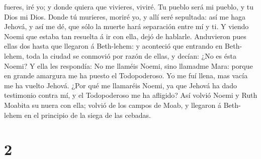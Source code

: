 fueres, iré yo; y donde quiera que vivieres, viviré. Tu pueblo será mi
pueblo, y tu Dios mi Dios.  Donde tú murieres, moriré yo,
y allí seré sepultada: así me haga Jehová, y así me dé, que sólo la
muerte hará separación entre mí y ti.  Y viendo Noemi que
estaba tan resuelta á ir con ella, dejó de hablarle. 
Anduvieron pues ellas dos hasta que llegaron á Beth-lehem: y aconteció
que entrando en Beth-lehem, toda la ciudad se conmovió por razón de
ellas, y decían: ¿No es ésta Noemi?  Y ella les
respondía: No me llaméis Noemi, sino llamadme Mara: porque en grande
amargura me ha puesto el Todopoderoso.  Yo me fuí llena,
mas vacía me ha vuelto Jehová. ¿Por qué me llamaréis Noemi, ya que
Jehová ha dado testimonio contra mí, y el Todopoderoso me ha afligido?
 Así volvió Noemi y Ruth Moabita su nuera con ella;
volvió de los campos de Moab, y llegaron á Beth-lehem en el principio de
la siega de las cebadas.

\hypertarget{section-1}{%
\section{2}\label{section-1}}

